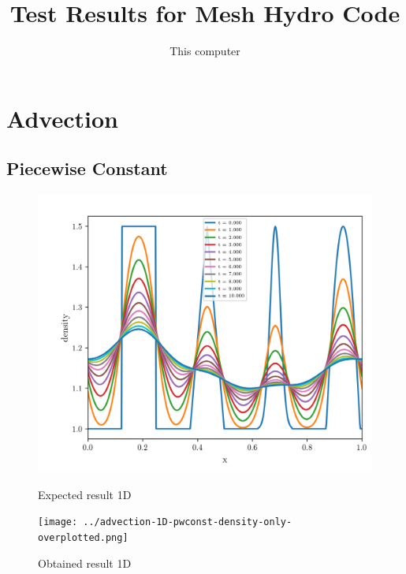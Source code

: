 




\title{Test Results for Mesh Hydro Code}
\author{This computer}
\date{}










	

\maketitle

\tableofcontents
\clearpage



\section{Advection}

\subsection{Piecewise Constant}

\begin{figure}[htbp]
    \centering
	\includegraphics[width=.7\textwidth]{./figures/advection-1D-pwconst-density-only-overplotted.png}%
	\caption{Expected result 1D}
	\texttt{[image: ../advection-1D-pwconst-density-only-overplotted.png]}%
	\caption{Obtained result 1D}
\end{figure}

